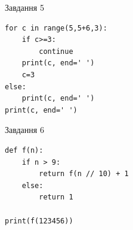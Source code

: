 \documentclass[12pt, ukrainian]{article}
\begin{document}
{\vspace{15mm}
\begin{minipage}[t]{9.7cm}                
{\begin{center}Завдання {5}\end{center}}
\begin{verbatim}
for c in range(5,5+6,3):
    if c>=3:
        continue
    print(c, end=' ')
    c=3
else:
    print(c, end=' ')
print(c, end=' ')
\end{verbatim}     
\end{minipage}
\vline \hspace{8mm}
\begin{minipage}[t]{8.0cm}                
{\begin{center}Завдання {6}\end{center}}
\begin{verbatim}
def f(n):
    if n > 9:
        return f(n // 10) + 1
    else:
        return 1

print(f(123456))
\end{verbatim}     
\end{minipage}

}
\newpage

\end{document}
